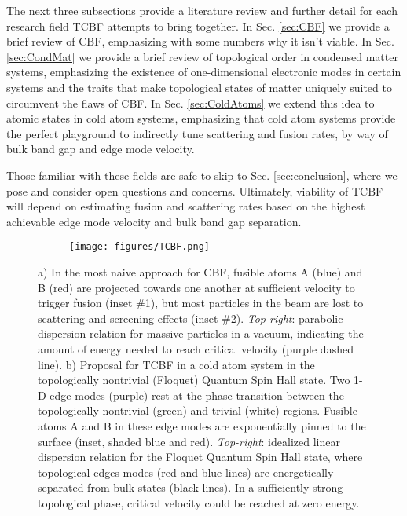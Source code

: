 \documentclass[onecolumn,
               superscriptaddress,
               floatfix,
               longbibliography, 
               showkeys,apl]{revtex4-2}
\begin{document}
The next three subsections provide a literature review and further detail for each research field TCBF attempts to bring together. In Sec. \ref{sec:CBF} we provide a brief review of CBF, emphasizing with some numbers why it isn't viable. In Sec. \ref{sec:CondMat} we provide a brief review of topological order in condensed matter systems, emphasizing the existence of one-dimensional electronic modes in certain systems and the traits that make topological states of matter uniquely suited to circumvent the flaws of CBF. In Sec. \ref{sec:ColdAtoms} we extend this idea to atomic states in cold atom systems, emphasizing that cold atom systems provide the perfect playground to indirectly tune scattering and fusion rates, by way of bulk band gap and edge mode velocity. 

Those familiar with these fields are safe to skip to Sec. \ref{sec:conclusion}, where we pose and consider open questions and concerns. Ultimately, viability of TCBF will depend on estimating fusion and scattering rates based on the highest achievable edge mode velocity and bulk band gap separation.


\begin{figure}[H]
\begin{subfigure}{.5\textwidth}
    \centering
    \caption{}    
    \label{subfig:CBF}
\end{subfigure}
\begin{subfigure}{.5\textwidth}
    \centering
    \texttt{[image: figures/TCBF.png]}
    \caption{}
    \label{subfig:TCBF}
\end{subfigure}
\caption{a) In the most naive approach for CBF, fusible atoms A (blue) and B (red) are projected towards one another at sufficient velocity to trigger fusion (inset \#1), but most particles in the beam are lost to scattering and screening effects (inset \#2). \textit{Top-right}: parabolic dispersion relation for massive particles in a vacuum, indicating the amount of energy needed to reach critical velocity (purple dashed line). b) Proposal for TCBF in a cold atom system in the topologically nontrivial (Floquet) Quantum Spin Hall state. Two 1-D edge modes (purple) rest at the phase transition between the topologically nontrivial (green) and trivial (white) regions. Fusible atoms A and B in these edge modes are exponentially pinned to the surface (inset, shaded blue and red). \textit{Top-right}: idealized linear dispersion relation for the Floquet Quantum Spin Hall state, where topological edges modes (red and blue lines) are energetically separated from bulk states (black lines). In a sufficiently strong topological phase, critical velocity could be reached at zero energy.}
\end{figure}
\end{document}
